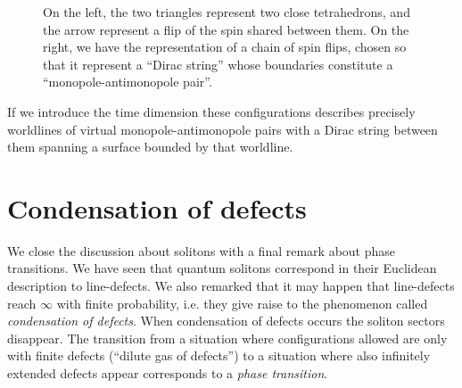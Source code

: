 \documentclass[../main/main.tex]{subfiles}
\begin{document}
\begin{figure}[h]

\caption{On the left, the two triangles represent two close tetrahedrons, and the arrow represent a flip of the spin shared between them. On the right, we have the representation of a chain of spin flips, chosen so that it represent a ``Dirac string'' whose boundaries constitute a ``monopole-antimonopole pair''. }
\label{fig:spin-flips}
\end{figure}

If we introduce the time dimension these configurations describes precisely worldlines of  virtual monopole-antimonopole pairs with a Dirac string between them spanning a surface bounded by that worldline. 

\section{Condensation of defects}\label{sec:condensation-defects}

We close the discussion about solitons with a final remark about phase transitions. We have seen that quantum solitons correspond in their Euclidean description to line-defects. We also remarked that it may happen that line-defects reach $\infty$ with finite probability, i.e. they give raise to the phenomenon called \emph{condensation of defects}. When condensation of defects occurs the soliton sectors disappear. The transition from a situation where configurations allowed are only with finite defects (``dilute gas of defects'') to a situation where also infinitely extended defects appear corresponds to a \emph{phase transition}. 
\end{document}
